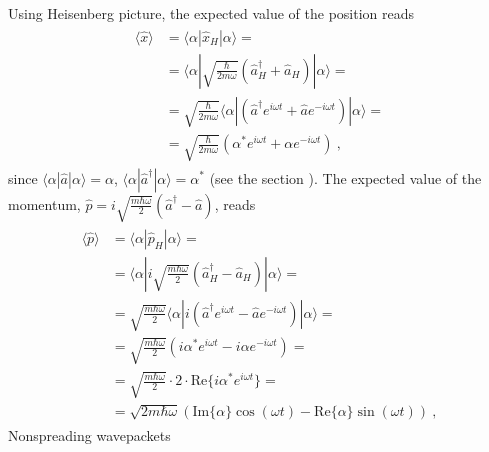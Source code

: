 \documentclass[letterpaper,10pt,english]{jupyterBook}
\begin{document}
\sphinxAtStartPar
Using Heisenberg picture, the expected value of the position reads
\begin{equation*}
\begin{split}\begin{aligned}
  \langle \hat{x} \rangle
  & = \langle \alpha | \hat{x}_H | \alpha \rangle = \\
  & = \langle \alpha | \sqrt{\frac{\hbar}{2 m \omega}} \left( \hat{a}^\dagger_H + \hat{a}_H \right) | \alpha \rangle = \\
  & = \sqrt{\frac{\hbar}{2 m \omega}} \langle \alpha | \left( \hat{a}^\dagger e^{i \omega t} + \hat{a} e^{-i \omega t} \right) | \alpha \rangle = \\
  & = \sqrt{\frac{\hbar}{2 m \omega}} \left( \alpha^* e^{i \omega t} + \alpha e^{-i \omega t} \right) \ ,
\end{aligned}\end{split}
\end{equation*}
\sphinxAtStartPar
since \(\langle \alpha | \hat{a} | \alpha \rangle = \alpha\), \(\langle \alpha | \hat{a}^\dagger | \alpha \rangle = \alpha^*\) (see the section {\hyperref[\detokenize{ch/quantum-mechanics/qft/photons-coulomb:quantum-mechanics-qft-photons-coulomb-classical-limit-one-mode-coherent}]{}}). The expected value of the momentum, \(\hat{p} = i \sqrt{\frac{m \hbar \omega}{2}} \left( \hat{a}^{\dagger} - \hat{a} \right)\), reads
\begin{equation*}
\begin{split}\begin{aligned}
  \langle \hat{p} \rangle
  & = \langle \alpha | \hat{p}_H | \alpha \rangle = \\
  & = \langle \alpha | i \sqrt{\frac{m \hbar \omega}{2}} \left( \hat{a}^\dagger_H - \hat{a}_H \right) | \alpha \rangle = \\
  & = \sqrt{\frac{m \hbar \omega}{2}} \langle \alpha | i \left( \hat{a}^\dagger e^{i \omega t} - \hat{a} e^{-i \omega t} \right) | \alpha \rangle = \\
  & = \sqrt{\frac{m \hbar \omega}{2}} \left( i \alpha^* e^{i \omega t} - i \alpha e^{-i \omega t} \right) = \\
  & = \sqrt{\frac{m \hbar \omega}{2}} \cdot 2 \cdot \text{Re} \{ i \alpha^* e^{i \omega t} \} = \\
  & = \sqrt{ 2 m \hbar \omega} \left( \text{Im}\{ \alpha \} \cos( \omega t ) - \text{Re} \{ \alpha \} \sin(\omega t) \right) \ ,
\end{aligned}\end{split}
\end{equation*}
\sphinxAtStartPar
Non\sphinxhyphen{}spreading wave\sphinxhyphen{}packets
\end{document}
